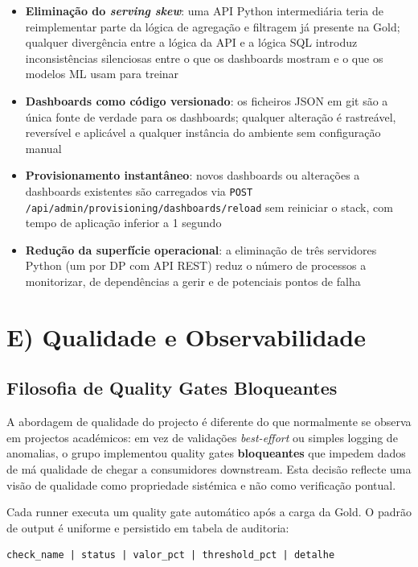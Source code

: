 \documentclass[11pt,a4paper]{article}
\begin{document}
\begin{itemize}[leftmargin=*,noitemsep]
  \item \textbf{Eliminação do \textit{serving skew}}: uma API Python intermediária teria de reimplementar parte da lógica de agregação e filtragem já presente na Gold; qualquer divergência entre a lógica da API e a lógica SQL introduz inconsistências silenciosas entre o que os dashboards mostram e o que os modelos ML usam para treinar
  \item \textbf{Dashboards como código versionado}: os ficheiros JSON em git são a única fonte de verdade para os dashboards; qualquer alteração é rastreável, reversível e aplicável a qualquer instância do ambiente sem configuração manual
  \item \textbf{Provisionamento instantâneo}: novos dashboards ou alterações a dashboards existentes são carregados via \texttt{POST /api/admin/provisioning/dashboards/reload} sem reiniciar o stack, com tempo de aplicação inferior a 1 segundo
  \item \textbf{Redução da superfície operacional}: a eliminação de três servidores Python (um por DP com API REST) reduz o número de processos a monitorizar, de dependências a gerir e de potenciais pontos de falha
\end{itemize}

\section{E) Qualidade e Observabilidade}
\label{sec:quality}

\subsection{Filosofia de Quality Gates Bloqueantes}

A abordagem de qualidade do projecto é diferente do que normalmente se observa em projectos académicos: em vez de validações \textit{best-effort} ou simples logging de anomalias, o grupo implementou quality gates \textbf{bloqueantes} que impedem dados de má qualidade de chegar a consumidores downstream. Esta decisão reflecte uma visão de qualidade como propriedade sistémica e não como verificação pontual.

Cada runner executa um quality gate automático após a carga da Gold. O padrão de output é uniforme e persistido em tabela de auditoria:

\begin{lstlisting}
check_name | status | valor_pct | threshold_pct | detalhe
\end{lstlisting}
\end{document}
